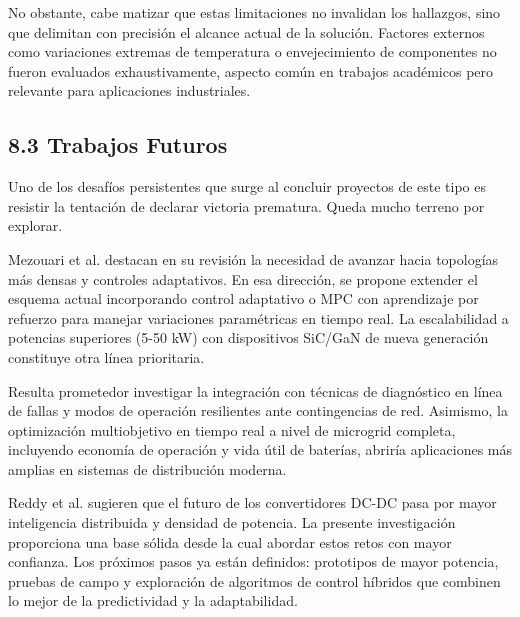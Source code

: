 No obstante, cabe matizar que estas limitaciones no invalidan los hallazgos, sino que delimitan con precisión el alcance actual de la solución. Factores externos como variaciones extremas de temperatura o envejecimiento de componentes no fueron evaluados exhaustivamente, aspecto común en trabajos académicos pero relevante para aplicaciones industriales.

\subsection{8.3 Trabajos Futuros}

Uno de los desafíos persistentes que surge al concluir proyectos de este tipo es resistir la tentación de declarar victoria prematura. Queda mucho terreno por explorar.

Mezouari et al. \cite{Mezouari2025} destacan en su revisión la necesidad de avanzar hacia topologías más densas y controles adaptativos. En esa dirección, se propone extender el esquema actual incorporando control adaptativo o MPC con aprendizaje por refuerzo para manejar variaciones paramétricas en tiempo real. La escalabilidad a potencias superiores (5-50 kW) con dispositivos SiC/GaN de nueva generación constituye otra línea prioritaria.

Resulta prometedor investigar la integración con técnicas de diagnóstico en línea de fallas y modos de operación resilientes ante contingencias de red. Asimismo, la optimización multiobjetivo en tiempo real a nivel de microgrid completa, incluyendo economía de operación y vida útil de baterías, abriría aplicaciones más amplias en sistemas de distribución moderna.

Reddy et al. \cite{Reddy2025} sugieren que el futuro de los convertidores DC-DC pasa por mayor inteligencia distribuida y densidad de potencia. La presente investigación proporciona una base sólida desde la cual abordar estos retos con mayor confianza. Los próximos pasos ya están definidos: prototipos de mayor potencia, pruebas de campo y exploración de algoritmos de control híbridos que combinen lo mejor de la predictividad y la adaptabilidad.